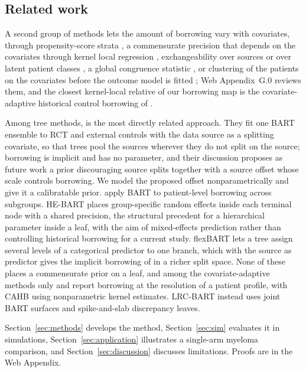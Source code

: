 \documentclass[11pt]{article}
\theoremstyle{definition}
\theoremstyle{plain}
\begin{document}
\subsection{Related work}
\label{sec:related}

A second group of methods lets the amount of borrowing vary with covariates, through propensity-score strata \citep{Wang2019PSPP,Chen2020PSCL}, a commensurate precision that depends on the covariates through kernel local regression \citep{Jin2023CAHB}, exchangeability over sources or over latent patient classes \citep{Kaizer2018MEM,Kotalik2021,Alt2024LEAP}, a global congruence statistic \citep{Jiang2023elastic}, or clustering of the patients on the covariates before the outcome model is fitted \citep{Bi2026SAMHC,Chandra2023}; Web Appendix~G.0 reviews them, and the closest kernel-local relative of our borrowing map is the covariate-adaptive historical control borrowing of \citet{Jin2023CAHB}.

Among tree methods, \citet{ZhouJi2021} is the most directly related approach. They fit one BART ensemble \citep{Chipman2010BART} to RCT and external controls with the data source as a splitting covariate, so that trees pool the sources wherever they do not split on the source; borrowing is implicit and has no parameter, and their discussion proposes as future work a prior discouraging source splits together with a source offset whose scale controls borrowing. We model the proposed offset nonparametrically and give it a calibratable prior. \citet{Pan2022} apply BART to patient-level borrowing across subgroups. HE-BART \citep{Wundervald2022HEBART} places group-specific random effects inside each terminal node with a shared precision, the structural precedent for a hierarchical parameter inside a leaf, with the aim of mixed-effects prediction rather than controlling historical borrowing for a current study. flexBART \citep{Deshpande2025flexBART} lets a tree assign several levels of a categorical predictor to one branch, which with the source as predictor gives the implicit borrowing of \citet{ZhouJi2021} in a richer split space. None of these places a commensurate prior on a leaf, and among the covariate-adaptive methods only \citet{Jin2023CAHB} and \citet{Alt2024LEAP} report borrowing at the resolution of a patient profile, with CAHB using nonparametric kernel estimates. LRC-BART instead uses joint BART surfaces and spike-and-slab discrepancy leaves.

Section~\ref{sec:methods} develops the method, Section~\ref{sec:sim} evaluates it in simulations, Section~\ref{sec:application} illustrates a single-arm myeloma comparison, and Section~\ref{sec:discussion} discusses limitations. Proofs are in the Web Appendix.
\end{document}

